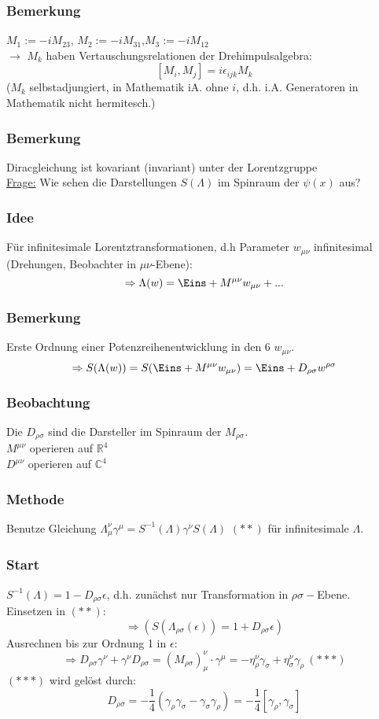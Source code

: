 \documentclass[twoside,a4paper]{scrartcl}
\newcommand{\R}{\mathbb{R}}
\newcommand{\C}{\mathbb{C}}
\renewcommand{\1}{\mathds{1}}
\newcommand{\Ra}{\Rightarrow}
\newcommand{\ra}{\rightarrow}
\renewcommand{\L}{\Lambda}
\renewcommand{\R}{\mathbb{R}}
\renewcommand{\C}{\mathbb{C}}
\begin{document}
\subsubsection*{Bemerkung}
$M_1:=-iM_{23}$, $M_2:=-iM_{31}$,$M_3:=-iM_{12}$\\
$\ra$ $M_k$ haben Vertauschungsrelationen der Drehimpulsalgebra:
$$[M_i,M_j]=i\epsilon_{ijk}M_k$$
($M_k$ selbstadjungiert, in Mathematik iA. ohne $i$, d.h. i.A. Generatoren in Mathematik nicht hermitesch.)
% 
\subsubsection*{Bemerkung}
Diracgleichung ist kovariant (invariant) unter der Lorentzgruppe\\
\underline{Frage:} Wie sehen die Darstellungen $S(\L)$ im Spinraum der $\psi(x)$ aus?
\subsubsection*{Idee}
Für infinitesimale Lorentztransformationen, d.h Parameter $w_{\mu\nu}$ infinitesimal (Drehungen, Beobachter in $\mu\nu$-Ebene):
$$\Ra \L(w)=\Eins+M^{\mu\nu}w_{\mu\nu}+...$$
\subsubsection*{Bemerkung}
Erste Ordnung einer Potenzreihenentwicklung in den 6 $w_{\mu\nu}$.\\
$$\Ra S(\L(w))=S(\Eins+M^{\mu\nu}w_{\mu\nu})=\Eins+D_{\rho\sigma}w^{\rho\sigma}$$
\subsubsection*{Beobachtung}
Die $D_{\rho\sigma}$ sind die Darsteller im Spinraum der $M_{\rho\sigma}$.\\
$M^{\mu\nu}$ operieren auf $\R^4$\\
$D^{\mu\nu}$ operieren auf $\C^4$
\subsubsection*{Methode}
Benutze Gleichung $\L^\nu_\mu \gamma^\mu=S^{-1}(\L)\gamma^\nu S(\L)$ $(**)$ für infinitesimale $\L$.
\subsubsection*{Start}
$S^{-1}(\L)=1-D_{\rho\sigma}\epsilon$, d.h. zunächst nur Transformation in $\rho\sigma-$Ebene.\\
Einsetzen in $(**)$:
$$\Ra (S(\L_{\rho\sigma}(\epsilon))=1+D_{\rho\sigma}\epsilon)$$
Ausrechnen bis zur Ordnung 1 in $\epsilon$:
$$\Ra D_{\rho\sigma}\gamma^\nu+\gamma^\nu D_{\rho\sigma}=(M_{\rho\sigma})^\nu_\mu \cdot \gamma^\mu=-\eta_\rho^\nu\gamma_\sigma+\eta^\nu_\sigma \gamma_\rho \ (***)$$
$(***)$ wird gelöst durch:
$$D_{\rho\sigma}=-\frac{1}{4}(\gamma_\rho\gamma_\sigma-\gamma_\sigma\gamma_\rho)=-\frac{1}{4}[\gamma_\rho,\gamma_\sigma]$$
\end{document}
